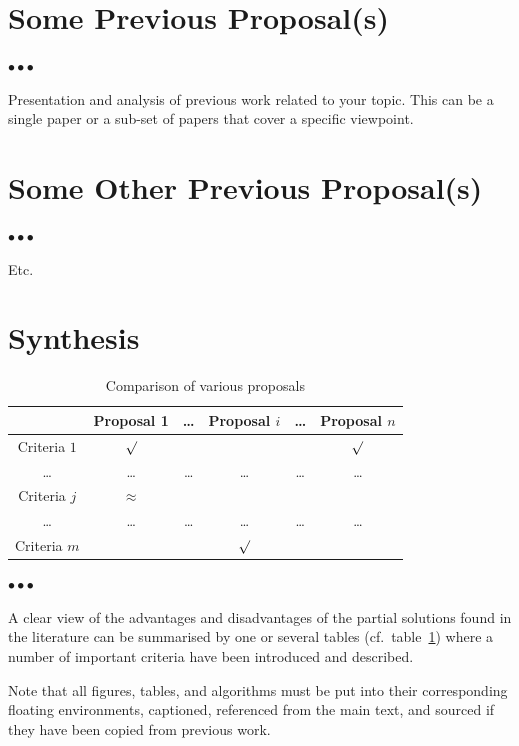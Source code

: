 \documentclass[11pt, english, screen, research-development]{report-rd-info}
\newenvironment{explanation}
{\color{blue}
 \begin{list}{}{\hspace{0.2\textwidth}\color{blue}}\item $\bullet\bullet\bullet$
}
{\end{list}}
\begin{document}
\section{Some Previous Proposal(s)}

\begin{explanation}
   Presentation and analysis of previous work related to your topic.
   This can be a single paper or a sub-set of papers that cover a specific viewpoint.
\end{explanation}

\section{Some Other Previous Proposal(s)}

\begin{explanation}
   Etc.
\end{explanation}

\section{Synthesis}

\begin{table} %
    \begin{center}
        \begin{tabular}{c|ccccc}
                         & Proposal 1 & \ldots & Proposal $i$ & \ldots & Proposal $n$ \\
            \hline
            Criteria $1$ & $\surd$    &        &              &        & $\surd$      \\
            \ldots       & \ldots     & \ldots & \ldots       & \ldots & \ldots       \\
            Criteria $j$ & $\approx$  &        &              &        &              \\
            \ldots       & \ldots     & \ldots & \ldots       & \ldots & \ldots       \\
            Criteria $m$ &            &        & $\surd$      &        &              \\
        \end{tabular}
    \end{center}
    \caption{Comparison of various proposals}
    \label{tab:ProposalsComparison}
\end{table}

\begin{explanation}
   A clear view of the advantages and disadvantages of the partial solutions found in the literature can be summarised by one or several tables (cf.~table~\ref{tab:ProposalsComparison}) where a number of important criteria have been introduced and described.

   Note that all figures, tables, and algorithms must be put into their corresponding floating environments, captioned, referenced from the main text, and sourced if they have been copied from previous work.
\end{explanation}
\end{document}
